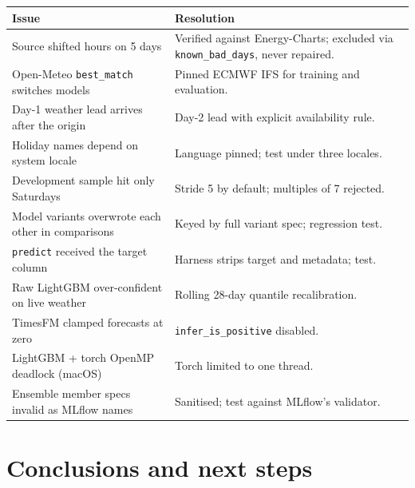 \documentclass[11pt,a4paper]{article}
\newcommand{\code}[1]{\texttt{#1}}
\begin{document}
{\small\noindent
\begin{tabularx}{\linewidth}{>{\raggedright\arraybackslash}p{4.2cm}X}
\toprule
Issue & Resolution\\
\midrule
Source shifted hours on 5 days & Verified against Energy-Charts; excluded via \code{known\_bad\_days}, never repaired.\\
Open-Meteo \code{best\_match} switches models & Pinned ECMWF IFS for training and evaluation.\\
Day-1 weather lead arrives after the origin & Day-2 lead with explicit availability rule.\\
Holiday names depend on system locale & Language pinned; test under three locales.\\
Development sample hit only Saturdays & Stride 5 by default; multiples of 7 rejected.\\
Model variants overwrote each other in comparisons & Keyed by full variant spec; regression test.\\
\code{predict} received the target column & Harness strips target and metadata; test.\\
Raw LightGBM over-confident on live weather & Rolling 28-day quantile recalibration.\\
TimesFM clamped forecasts at zero & \code{infer\_is\_positive} disabled.\\
LightGBM + torch OpenMP deadlock (macOS) & Torch limited to one thread.\\
Ensemble member specs invalid as MLflow names & Sanitised; test against MLflow's validator.\\
\bottomrule
\end{tabularx}\par}

\section{Conclusions and next steps}
\end{document}
